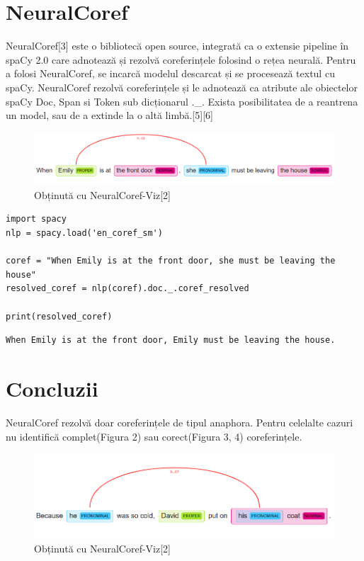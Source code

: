 \documentclass[letterpaper,12pt, dvipsnames, dateno]{article}
\begin{document}
\section{NeuralCoref}
NeuralCoref[3] este o bibliotecă open source, integrată ca o extensie pipeline în spaCy 2.0 care adnotează și rezolvă coreferințele folosind o rețea neurală.  Pentru a folosi NeuralCoref, se incarcă modelul descarcat  și se procesează textul cu spaCy. NeuralCoref rezolvă coreferințele și le adnotează ca atribute ale obiectelor spaCy Doc, Span si Token  sub dicționarul  .\_. 
Exista posibilitatea de a reantrena un model, sau de a extinde la o altă limbă.[5][6]\\


\begin{figure}[ht]
    \includegraphics[scale=0.70]{exemplu-coref2.PNG}
    \caption{Obținută cu NeuralCoref-Viz[2]}
    \label{fig:my_label}
\end{figure}


\begin{lstlisting}[showstringspaces=false]
import spacy
nlp = spacy.load('en_coref_sm')

coref = "When Emily is at the front door, she must be leaving the house"
resolved_coref = nlp(coref).doc._.coref_resolved

print(resolved_coref)
\end{lstlisting}
% 


\begin{verbatim}
When Emily is at the front door, Emily must be leaving the house.
\end{verbatim}

\section{Concluzii}
NeuralCoref rezolvă doar coreferințele de tipul anaphora. Pentru celelalte cazuri nu identifică complet(Figura 2) sau corect(Figura 3, 4) coreferințele.

\begin{figure}[ht]
    \includegraphics[scale=0.70]{coref1.PNG}
    \caption{Obținută cu NeuralCoref-Viz[2]}
    \label{fig:my_label}
\end{figure}
\end{document}
